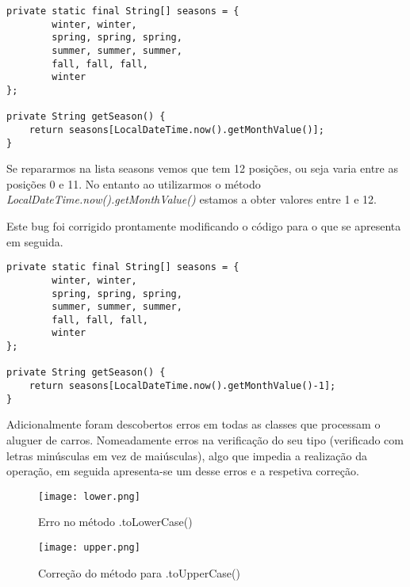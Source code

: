 \begin{lstlisting}
private static final String[] seasons = {
        winter, winter,
        spring, spring, spring,
        summer, summer, summer,
        fall, fall, fall,
        winter
};

private String getSeason() {
    return seasons[LocalDateTime.now().getMonthValue()];
}
\end{lstlisting}
\hfill\newline
\par Se repararmos na lista seasons vemos que tem 12 posições, ou seja varia entre as posições 0 e 11.
No entanto ao utilizarmos o método \textit{LocalDateTime.now().getMonthValue()} estamos a obter valores entre 1 e 12.\newline
\par Este bug foi corrigido prontamente modificando o código para o que se apresenta em seguida.\newline
\hfill\newline
\begin{lstlisting}
private static final String[] seasons = {
        winter, winter,
        spring, spring, spring,
        summer, summer, summer,
        fall, fall, fall,
        winter
};

private String getSeason() {
    return seasons[LocalDateTime.now().getMonthValue()-1];
}
\end{lstlisting}
\hfill\newline


\par Adicionalmente foram descobertos erros em todas as classes que processam o aluguer de carros. Nomeadamente erros na verificação do seu tipo (verificado com letras minúsculas em vez de maiúsculas), algo que impedia a realização da operação, em seguida apresenta-se um desse erros e a respetiva correção.

\begin{figure}[H]
  \centering

  \texttt{[image: lower.png]}

  \caption {Erro no método .toLowerCase()}

  \label {fig47}
\end{figure}
\begin{figure}[H]
  \centering

  \texttt{[image: upper.png]}

  \caption {Correção do método para .toUpperCase()}

  \label {fig48}
\end{figure}

